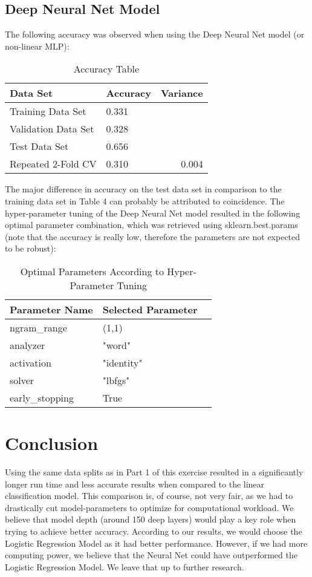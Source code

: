 \documentclass[fleqn,10pt]{SelfArx} %
\begin{document}
\subsection{Deep Neural Net Model}
The following accuracy was observed when using the Deep Neural Net model (or non-linear MLP):
\begin{table}[hbt]
	\caption{Accuracy Table}
	\centering
	\begin{tabular}{llr}
		\toprule
		 Data Set & Accuracy & Variance\\
		\midrule
		Training Data Set & 0.331 \\
		Validation Data Set & 0.328\\
		Test Data Set & 0.656 \\
		Repeated 2-Fold CV & 0.310 & 0.004\\
		\bottomrule
	\end{tabular}
	\label{tab:label}
\end{table}\newline
The major difference in accuracy on the test data set in comparison to the training data set in Table 4 can probably be attributed to coincidence. The hyper-parameter tuning of the Deep Neural Net model resulted in the following optimal parameter combination, which was retrieved using sklearn.best.params (note that the accuracy is really low, therefore the parameters are not expected to be robust):\newline
\begin{table}[hbt]
	\caption{Optimal Parameters According to Hyper-Parameter Tuning}
	\centering
	\begin{tabular}{llr}
		\toprule
		 Parameter Name &  Selected Parameter\\
		\midrule
		ngram\_range & (1,1) \\
		analyzer & "word" \\
		activation & "identity" \\
		solver & "lbfgs" \\
        early\_stopping & True \\
		\bottomrule
	\end{tabular}
	\label{tab:label}
\end{table}\newline

\section{Conclusion}
Using the same data splits as in Part 1 of this exercise resulted in a significantly longer run time and less accurate results when compared to the linear classification model. This comparison is, of course, not very fair, as we had to drastically cut model-parameters to optimize for computational workload. We believe that model depth (around 150 deep layers) would play a key role when trying to achieve better accuracy. According to our results, we would choose the Logistic Regression Model as it had better performance. However, if we had more computing power, we believe that the Neural Net could have outperformed the Logistic Regression Model. We leave that up to further research.
\end{document}
